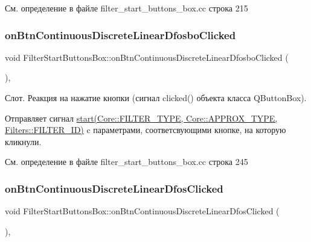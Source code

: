 См. определение в файле filter\+\_\+start\+\_\+buttons\+\_\+box.\+cc строка 215

\hypertarget{class_filter_start_buttons_box_a21b70f241dd25b7a84c515ca3fed37e8}{}\label{class_filter_start_buttons_box_a21b70f241dd25b7a84c515ca3fed37e8} 
\subsubsection{\texorpdfstring{on\+Btn\+Continuous\+Discrete\+Linear\+Dfosbo\+Clicked}{onBtnContinuousDiscreteLinearDfosboClicked}}
{\footnotesize\ttfamily void Filter\+Start\+Buttons\+Box\+::on\+Btn\+Continuous\+Discrete\+Linear\+Dfosbo\+Clicked (\begin{DoxyParamCaption}{ }\end{DoxyParamCaption})\hspace{0.3cm}{\ttfamily [private]}, {\ttfamily [slot]}}

Слот. Реакция на нажатие кнопки (сигнал clicked() объекта класса Q\+Button\+Box).

Отправляет сигнал \hyperlink{class_filter_start_buttons_box_ac6e2a6555f1d388391f188f834b8e753}{start(\+Core\+::\+F\+I\+L\+T\+E\+R\+\_\+\+T\+Y\+P\+E, Core\+::\+A\+P\+P\+R\+O\+X\+\_\+\+T\+Y\+P\+E, Filters\+::\+F\+I\+L\+T\+E\+R\+\_\+\+I\+D)} c параметрами, соответсвующими кнопке, на которую кликнули. 

См. определение в файле filter\+\_\+start\+\_\+buttons\+\_\+box.\+cc строка 245

\hypertarget{class_filter_start_buttons_box_a5d435bcb19360e97bf81205d21cc88ca}{}\label{class_filter_start_buttons_box_a5d435bcb19360e97bf81205d21cc88ca} 
\subsubsection{\texorpdfstring{on\+Btn\+Continuous\+Discrete\+Linear\+Dfos\+Clicked}{onBtnContinuousDiscreteLinearDfosClicked}}
{\footnotesize\ttfamily void Filter\+Start\+Buttons\+Box\+::on\+Btn\+Continuous\+Discrete\+Linear\+Dfos\+Clicked (\begin{DoxyParamCaption}{ }\end{DoxyParamCaption})\hspace{0.3cm}{\ttfamily [private]}, {\ttfamily [slot]}}


